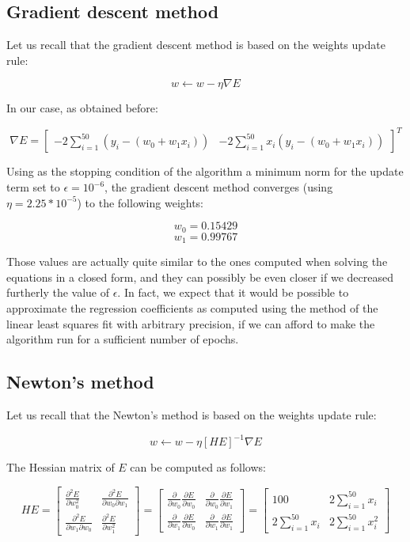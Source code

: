 \documentclass[letterpaper,headings=standardclasses]{scrartcl}
\begin{document}
\subsection{Gradient descent method}

Let us recall that the gradient descent method is based on the weights update rule:

$$ w \leftarrow w - \eta \nabla E $$

In our case, as obtained before:

$$ \nabla E = \left[ \begin{matrix} -2 \sum_{i = 1}^{50} (y_i - (w_0 + w_1 x_i)) & -2 \sum_{i = 1}^{50} x_i (y_i - (w_0 + w_1 x_i)) \end{matrix} \right]^T $$

Using as the stopping condition of the algorithm a minimum norm for the update term set to $\epsilon = 10^{-6}$, the gradient descent method converges (using $\eta = 2.25 * 10^{-5}$) to the following weights:

$$ w_0 = 0.15429 $$
$$ w_1 = 0.99767 $$

Those values are actually quite similar to the ones computed when solving the equations in a closed form, and they can possibly be even closer if we decreased furtherly the value of $\epsilon$. In fact, we expect that it would be possible to approximate the regression coefficients as computed using the method of the linear least squares fit with arbitrary precision, if we can afford to make the algorithm run for a sufficient number of epochs.

\subsection{Newton's method}

Let us recall that the Newton's method is based on the weights update rule:

$$ w \leftarrow w - \eta [HE]^{-1} \nabla E $$

The Hessian matrix of $E$ can be computed as follows:

$$ HE = \left[ \begin{matrix} \frac{\partial^2 E}{\partial w_0^2} & \frac{\partial^2 E}{\partial w_0 \partial w_1} \\[0.5em] \frac{\partial^2 E}{\partial w_1 \partial w_0} & \frac{\partial^2 E}{\partial w_1^2} \end{matrix} \right] = \left[ \begin{matrix} \frac{\partial}{\partial w_0} \frac{\partial E}{\partial w_0} & \frac{\partial}{\partial w_0} \frac{\partial E}{\partial w_1} \\[0.5em] \frac{\partial}{\partial w_1} \frac{\partial E}{\partial w_0} & \frac{\partial}{\partial w_1} \frac{\partial E}{\partial w_1} \end{matrix} \right] = \left[ \begin{matrix} 100 & 2 \sum_{i = 1}^{50} x_i \\[0.5em] 2 \sum_{i = 1}^{50} x_i & 2 \sum_{i = 1}^{50} x_i^2 \end{matrix} \right] $$
\end{document}
